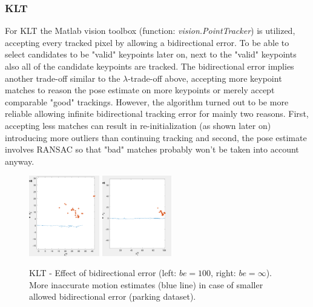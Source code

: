 \documentclass[letterpaper, 12 pt]{article}
\begin{document}
\begin{multicols*}{2}
\subsubsection{KLT}
For KLT the Matlab vision toolbox (function: \textit{vision.PointTracker}) is utilized, accepting every tracked pixel by allowing a bidirectional error. To be able to select candidates to be "valid" keypoints later on, next to the "valid" keypoints also all of the candidate keypoints are tracked. 
\newline
The bidirectional error implies another trade-off similar to the $\lambda$-trade-off above, accepting more keypoint matches to reason the pose estimate on more keypoints or merely accept comparable "good" trackings. However, the algorithm turned out to be more reliable allowing infinite bidirectional tracking error for mainly two reasons. First, accepting less matches can result in re-initialization (as shown later on) introducing more outliers than continuing tracking and second, the pose estimate involves RANSAC so that "bad" matches probably won't be taken into account anyway. 

\begin{figure}[H]
\begin{center}
\includegraphics[height=3.5cm]{parking_100bi.png}
\includegraphics[height=3.5cm]{parking_infbi.png}
\end{center}
\caption{KLT - Effect of bidirectional error (left: $be = 100$, right: $be = \infty$). More inaccurate motion estimates (blue line) in case of smaller allowed bidirectional error  (parking dataset).}
\label{fig:klt_error}
\end{figure}


\end{multicols*}
\end{document}

